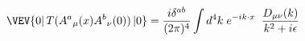 \begin{equation}
\VEV{0|\,T({A^{a}}_{\mu}(x){A^{b}}_{\nu}(0))\,|0}
=\frac{{i\delta^{ab}}}{{(2\pi)^{4}}} \int d^{4}k \;e^{-ik\cdot x}
\; \; \frac{D_{\mu\nu}(k)}{{k^{2}+i\epsilon}}
\end{equation}

